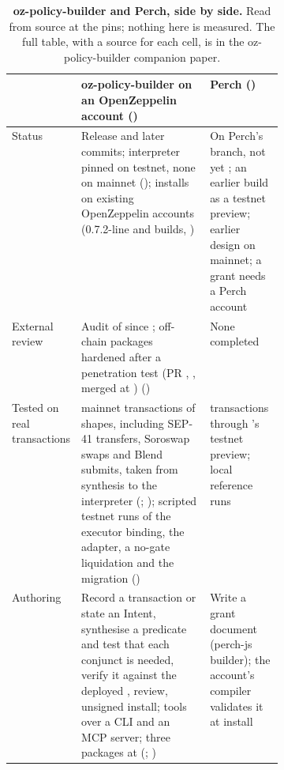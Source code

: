 \begin{table}[tbp]
\centering
\caption{\textbf{oz-policy-builder and Perch, side by side.} Read from source at the pins; nothing here is measured. The full table, with a source for each cell, is in the oz-policy-builder companion paper.}\label{tab:tab-choose}
\scriptsize\begin{tabularx}{\linewidth}{@{}>{\raggedright\arraybackslash}p{0.13\linewidth}L>{\raggedright\arraybackslash}p{0.27\linewidth}@{}}
\toprule
\textbf{} & \textbf{oz-policy-builder on an OpenZeppelin account ()} & \textbf{Perch ()} \\
\midrule
Status & Release  and later commits; interpreter pinned on testnet, none on mainnet (); installs on existing OpenZeppelin accounts (0.7.2-line and  builds, ) & On Perch's  branch, not yet ; an earlier build as a testnet preview; earlier design on mainnet; a grant needs a Perch account \\
External review & Audit of   since ; off-chain packages hardened after a penetration test (PR , , merged at ) () & None completed \\
Tested on real transactions &  mainnet transactions of  shapes, including SEP-41 transfers, Soroswap swaps and Blend submits, taken from synthesis to the interpreter (; ); scripted testnet runs of the executor binding, the adapter, a no-gate liquidation and the  migration () &  transactions through 's testnet preview; local reference runs \\
Authoring & Record a transaction or state an Intent, synthesise a predicate and test that each conjunct is needed, verify it against the deployed , review, unsigned install;  tools over a CLI and an MCP server; three packages at  (; ) & Write a grant document (perch-js builder); the account's compiler validates it at install \\

\end{tabularx}
\end{table}
